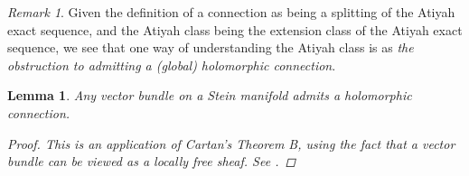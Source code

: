 \documentclass[11pt,fleqn]{article}
\theoremstyle{plain}
\newtheorem{lemma}[theorem]{Lemma}
\theoremstyle{definition}
\theoremstyle{remark}
\newtheorem{remark}[theorem]{Remark}
\numberwithin{equation}{theorem}
\begin{document}
        \begin{remark}
            Given the definition of a connection as being a splitting of the Atiyah exact sequence, and the Atiyah class being the extension class of the Atiyah exact sequence, we see that one way of understanding the Atiyah class is as \emph{the obstruction to admitting a (global) holomorphic connection}.
        \end{remark}

        \begin{lemma}
            Any vector bundle on a Stein manifold admits a holomorphic connection.
            \begin{proof}
                This is an application of Cartan's Theorem B, using the fact that a vector bundle can be viewed as a locally free sheaf.
                See \cite[Lemma~O.E.3]{Green1980}.
            \end{proof}
        \end{lemma}
\end{document}
